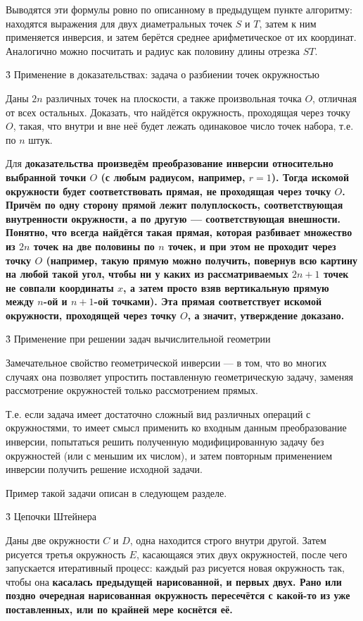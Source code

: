 Выводятся эти формулы ровно по описанному в предыдущем пункте алгоритму: находятся выражения для двух диаметральных точек $S$ и $T$, затем к ним применяется инверсия, и затем берётся среднее арифметическое от их координат. Аналогично можно посчитать и радиус как половину длины отрезка $ST$.


\h3{ Применение в доказательствах: задача о разбиении точек окружностью }

Даны $2n$ различных точек на плоскости, а также произвольная точка $O$, отличная от всех остальных. Доказать, что найдётся окружность, проходящая через точку $O$, такая, что внутри и вне неё будет лежать одинаковое число точек набора, т.е. по $n$ штук.

Для \bf{доказательства} произведём преобразование инверсии относительно выбранной точки $O$ (с любым радиусом, например, $r=1$). Тогда искомой окружности будет соответствовать прямая, не проходящая через точку $O$. Причём по одну сторону прямой лежит полуплоскость, соответствующая внутренности окружности, а по другую --- соответствующая внешности. Понятно, что всегда найдётся такая прямая, которая разбивает множество из $2n$ точек на две половины по $n$ точек, и при этом не проходит через точку $O$ (например, такую прямую можно получить, повернув всю картину на любой такой угол, чтобы ни у каких из рассматриваемых $2n+1$ точек не совпали координаты $x$, а затем просто взяв вертикальную прямую между $n$-ой и $n+1$-ой точками). Эта прямая соответствует искомой окружности, проходящей через точку $O$, а значит, утверждение доказано.


\h3{ Применение при решении задач вычислительной геометрии }

Замечательное свойство геометрической инверсии --- в том, что во многих случаях она позволяет упростить поставленную геометрическую задачу, заменяя рассмотрение окружностей только рассмотрением прямых.

Т.е. если задача имеет достаточно сложный вид различных операций с окружностями, то имеет смысл применить ко входным данным преобразование инверсии, попытаться решить полученную модифицированную задачу без окружностей (или с меньшим их числом), и затем повторным применением инверсии получить решение исходной задачи.

Пример такой задачи описан в следующем разделе.


\h3{ Цепочки Штейнера }

Даны две окружности $C$ и $D$, одна находится строго внутри другой. Затем рисуется третья окружность $E$, касающаяся этих двух окружностей, после чего запускается итеративный процесс: каждый раз рисуется новая окружность так, чтобы она \bf{касалась} предыдущей нарисованной, и первых двух. Рано или поздно очередная нарисованная окружность пересечётся с какой-то из уже поставленных, или по крайней мере коснётся её.

